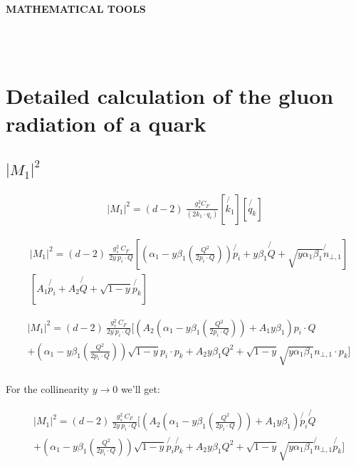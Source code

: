 \begin{LARGE}
\textbf{MATHEMATICAL TOOLS}
\end{LARGE}
\\
\\

\pagebreak

\section*{Detailed calculation of the gluon radiation of a quark}
\subsection*{$ |M_1|^2 $}

\begin{equation}
\begin{split}
|M_1|^2=(d-2)\:\frac{g_s^2  C_F }{(2k_1\cdot q_i)}
[\not{k_1} ][\not{q_k}]
\end{split}
\end{equation}

\begin{equation}
\begin{split}
&|M_1|^2=(d-2)\:\frac{g_s^2 \: C_F }{2y\: p_i \cdot Q}
[(\alpha_1 -y\beta_1(\frac{Q^2}{2p_i \cdot Q})) \not{p_i} + y\beta_1\not{Q} + \sqrt{y\alpha_1\beta_1}\not{n}_{\bot,1} ]\\
&[A_1\not{p_i} + A_2\not{Q} + \sqrt{1-y}\not{p_k}]
\end{split}
\end{equation}

\begin{equation}
\begin{split}
&|M_1|^2=(d-2)\:\frac{g_s^2 \: C_F }{2y\: p_i \cdot Q}
[(A_2(\alpha_1 -y\beta_1(\frac{Q^2}{2p_i \cdot Q}))+ A_1y\beta_1) {p_i}\cdot Q\\
&+(\alpha_1 -y\beta_1(\frac{Q^2}{2p_i \cdot Q}))\sqrt{1-y}p_i\cdot p_k+A_2 y\beta_1 Q^2+ \sqrt{1-y}\sqrt{y\alpha_1\beta_1}{n}_{\bot,1}\cdot p_k ]\\
\end{split}
\end{equation}

For the collinearity $ y \rightarrow 0 $ we'll get:

\begin{equation}
\begin{split}
&|M_1|^2=(d-2)\:\frac{g_s^2 \: C_F }{2y\: p_i \cdot Q}
[(A_2(\alpha_1 -y\beta_1(\frac{Q^2}{2p_i \cdot Q}))+ A_1y\beta_1) \not{p_i} \not{Q}\\
&+(\alpha_1 -y\beta_1(\frac{Q^2}{2p_i \cdot Q}))\sqrt{1-y}\not{p_i} \not{p_k}+A_2 y\beta_1 Q^2+ \sqrt{1-y}\sqrt{y\alpha_1\beta_1}\not{n}_{\bot,1} \not{p_k} ]\\
\end{split}
\end{equation}


